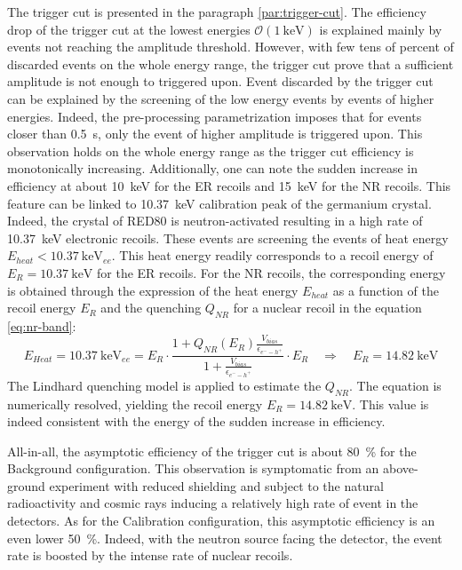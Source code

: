 The trigger cut is presented in the paragraph \ref{par:trigger-cut}. The efficiency drop of the trigger cut at the lowest energies $\mathcal{O}(\SI{1}{\kilo\eV})$ is explained mainly  by events not reaching the amplitude threshold. However, with few tens of percent of discarded events on the whole energy range, the trigger cut prove that a sufficient amplitude is not enough to triggered upon. Event discarded by the trigger cut can be explained by the screening of the low energy events by events of higher energies. Indeed, the pre-processing parametrization imposes that for events closer than \SI{0.5}{\s}, only the event of higher amplitude is triggered upon. This observation holds on the whole energy range as the trigger cut efficiency is monotonically increasing.
Additionally, one can note the sudden increase in efficiency at about \SI{10}{\kilo\eV} for the ER recoils and \SI{15}{\kilo\eV} for the NR recoils. This feature can be linked to \SI{10.37}{\kilo\eV} calibration peak of the germanium crystal. Indeed,  the crystal of RED80 is neutron-activated resulting in a high rate of \SI{10.37}{\kilo\eV} electronic recoils. These events are screening the events of heat energy $E_{heat} < \SI{10.37}{\kilo\eV}_{ee}$. This heat energy readily corresponds to a recoil energy of $E_R=\SI{10.37}{\kilo\eV}$ for the ER recoils. For the NR recoils, the corresponding energy is obtained through the expression of the heat energy $E_{heat}$ as a function of the recoil energy $E_R$ and the quenching $Q_{NR}$ for a nuclear recoil in the equation \ref{eq:nr-band}:
\begin{equation}
\label{eq:15kev-enigma}
E_{Heat} = \SI{10.37}{\kilo\eV}_{ee} 
= 
E_R 
\cdot
\frac{
1 + Q_{NR} \left( E_R \right)\frac{V_{bias}}{\epsilon_{e^--h^+}}
}{
1 + \frac{V_{bias}}{\epsilon_{e^--h^+}}
} \cdot E_R
\quad \Rightarrow \quad
E_R = \SI{14.82}{\kilo\eV}
\end{equation}
The Lindhard quenching model is applied to estimate the $Q_{NR}$. The equation is numerically resolved, yielding the recoil energy $E_R = \SI{14.82}{\kilo\eV}$. This value is indeed consistent with the energy of the sudden increase in efficiency.

All-in-all, the asymptotic efficiency of the trigger cut is about \SI{80}{\percent} for the Background configuration. This observation is symptomatic from an above-ground experiment with reduced shielding and subject to the natural radioactivity and cosmic rays inducing a relatively high rate of event in the detectors. As for the Calibration configuration, this asymptotic efficiency is an even lower \SI{50}{\percent}. Indeed, with the neutron source facing the detector, the event rate is boosted by the intense rate of nuclear recoils.


